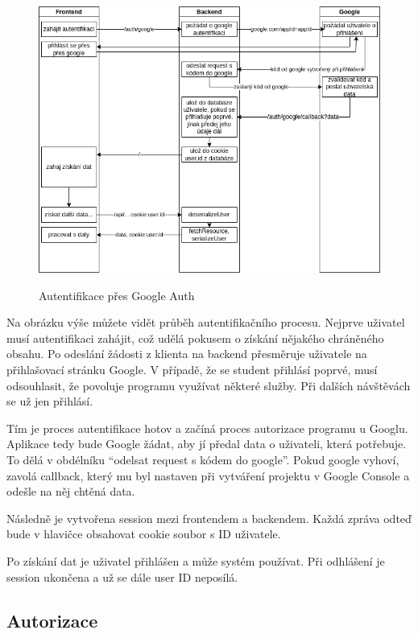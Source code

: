 \documentclass[a4paper,oneside,12pt]{report}
\begin{document}
\begin{figure}[H]
   \centering
   \includegraphics[height=9.5cm]{../img/googleAuth.png}
   \caption[Autentifikace přes Google Auth]{Autentifikace přes Google Auth}
   \label{fig:architecture}
\end{figure}

Na obrázku výše můžete vidět průběh autentifikačního procesu.
Nejprve uživatel musí autentifikaci zahájit, což udělá pokusem o získání nějakého chráněného obsahu.
Po odeslání žádosti z klienta na backend přesměruje uživatele na přihlašovací stránku Google.
V případě, že se student přihlásí poprvé, musí odsouhlasit, že povoluje programu využívat některé služby.
Při dalších návštěvách se už jen přihlásí.

Tím je proces autentifikace hotov a začíná proces autorizace programu u Googlu.
Aplikace tedy bude Google žádat, aby jí předal data o uživateli, která potřebuje.
To dělá v obdélníku “odelsat request s kódem do google”.
Pokud google vyhoví, zavolá callback, který mu byl nastaven při vytváření projektu v Google Console a odešle na něj chtěná data.

Následně je vytvořena session mezi frontendem a backendem. Každá zpráva odteď bude v hlavičce obsahovat cookie soubor s ID uživatele.

Po získání dat je uživatel přihlášen a může systém používat. Při odhlášení je session ukončena a už se dále user ID neposílá.

\subsection{Autorizace}
\end{document}
